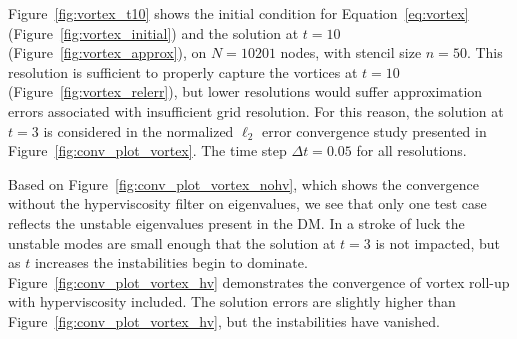 \documentclass{report}
\begin{document}
Figure~\ref{fig:vortex_t10} shows the initial condition for Equation~\ref{eq:vortex} (Figure~\ref{fig:vortex_initial}) and the solution at $t = 10$ (Figure~\ref{fig:vortex_approx}), on $N=10201$ nodes, with stencil size $n=50$. This resolution is sufficient to properly capture the vortices at $t=10$ (Figure~\ref{fig:vortex_relerr}), but lower resolutions would suffer approximation errors associated with insufficient grid resolution. 
For this reason, the solution at $t=3$ is considered in the normalized $\ell_2$ error convergence study presented in Figure~\ref{fig:conv_plot_vortex}. The time step $\Delta t = 0.05$ for all resolutions. 

Based on Figure~\ref{fig:conv_plot_vortex_nohv}, which shows the convergence without the hyperviscosity filter on eigenvalues, we see that only one test case reflects the unstable eigenvalues present in the DM. In a stroke of luck the unstable modes are small enough that the solution at $t=3$ is not impacted, but as $t$ increases the instabilities begin to dominate. Figure~\ref{fig:conv_plot_vortex_hv} demonstrates the convergence of vortex roll-up with hyperviscosity included. The solution errors are slightly higher than Figure~\ref{fig:conv_plot_vortex_hv}, but the instabilities have vanished. 
\end{document}
